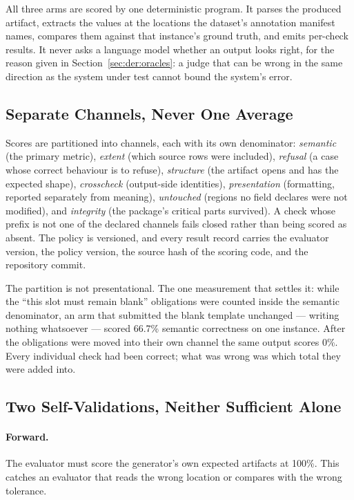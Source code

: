 All three arms are scored by one deterministic program. It parses the produced artifact,
extracts the values at the locations the dataset's annotation manifest names, compares them
against that instance's ground truth, and emits per-check results. It never asks a language
model whether an output looks right, for the reason given in Section~\ref{sec:der:oracles}:
a judge that can be wrong in the same direction as the system under test cannot bound the
system's error.

\subsection{Separate Channels, Never One Average}
\label{sec:eval:channels}

Scores are partitioned into channels, each with its own denominator: \emph{semantic} (the
primary metric), \emph{extent} (which source rows were included), \emph{refusal} (a case
whose correct behaviour is to refuse), \emph{structure} (the artifact opens and has the
expected shape), \emph{crosscheck} (output-side identities), \emph{presentation} (formatting,
reported separately from meaning), \emph{untouched} (regions no field declares were not
modified), and \emph{integrity} (the package's critical parts survived). A check whose prefix is not one of the declared channels
fails closed rather than being scored as absent. The policy is versioned, and every result
record carries the evaluator version, the policy version, the source hash of the scoring
code, and the repository commit.

The partition is not presentational. The one measurement that settles it: while the ``this
slot must remain blank'' obligations were counted inside the semantic denominator, an arm
that submitted the blank template unchanged --- writing nothing whatsoever --- scored 66.7\%
semantic correctness on one instance. After the obligations were moved into their own
channel the same output scores 0\%. Every individual check had been correct; what was wrong
was which total they were added into.

\subsection{Two Self-Validations, Neither Sufficient Alone}
\label{sec:eval:selfvalidation}

\paragraph{Forward.} The evaluator must score the generator's own expected artifacts at
100\%. This catches an evaluator that reads the wrong location or compares with the wrong
tolerance.

